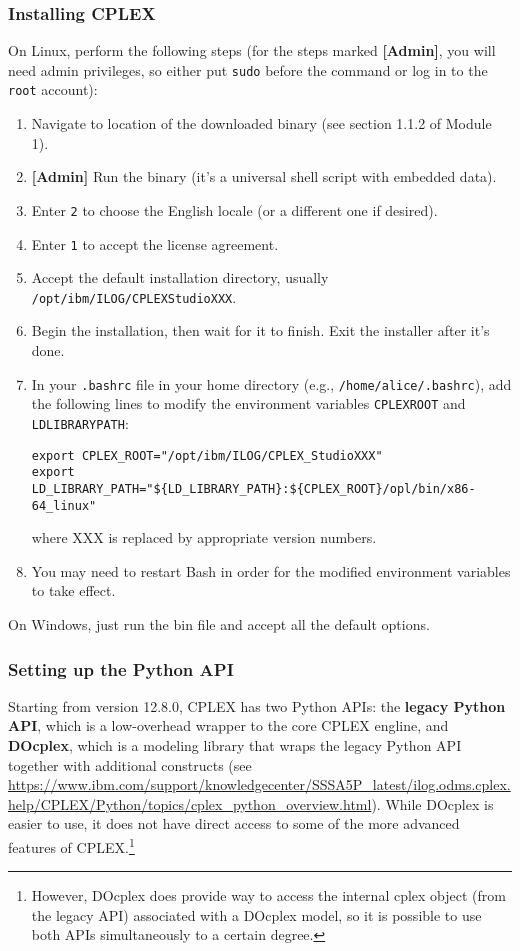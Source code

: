 \documentclass[12pt]{article}
\begin{document}
\subsubsection{Installing CPLEX}
On Linux, perform the following steps (for the steps marked \textbf{[Admin]}, you will need admin privileges, so either put \texttt{sudo} before the command or log in to the \texttt{root} account):
\begin{enumerate}
    \item Navigate to location of the downloaded binary (see section 1.1.2 of Module 1).
    \item \textbf{[Admin]} Run the binary (it's a universal shell script with embedded data).
    \item Enter \texttt{2} to choose the English locale (or a different one if desired).
    \item Enter \texttt{1} to accept the license agreement.
    \item Accept the default installation directory, usually \texttt{/opt/ibm/ILOG/CPLEX\ttul StudioXXX}.
    \item Begin the installation, then wait for it to finish. 
        Exit the installer after it's done.
    \item In your \texttt{.bashrc} file in your home directory (e.g., \texttt{/home/alice/.bashrc}), add the following lines to modify the environment variables \texttt{CPLEX\ttul ROOT} and \texttt{LD\ttul LIBRARY\ttul PATH}:
\begin{verbatim}
export CPLEX_ROOT="/opt/ibm/ILOG/CPLEX_StudioXXX"
export LD_LIBRARY_PATH="${LD_LIBRARY_PATH}:${CPLEX_ROOT}/opl/bin/x86-64_linux"
\end{verbatim}
        where XXX is replaced by appropriate version numbers.
    \item You may need to restart Bash in order for the modified environment variables to take effect.
\end{enumerate}
On Windows, just run the bin file and accept all the default options.

\subsubsection{Setting up the Python API}
Starting from version 12.8.0, CPLEX has two Python APIs: the \textbf{legacy Python API}, which is a low-overhead wrapper to the core CPLEX engline, and \textbf{DOcplex}, which is a modeling library that wraps the legacy Python API together with additional constructs (see \url{https://www.ibm.com/support/knowledgecenter/SSSA5P_latest/ilog.odms.cplex.help/CPLEX/Python/topics/cplex_python_overview.html}).
While DOcplex is easier to use, it does not have direct access to some of the more advanced features of CPLEX.\footnote{
    However, DOcplex does provide way to access the internal cplex object (from the legacy API) associated with a DOcplex model, so it is possible to use both APIs simultaneously to a certain degree.
}
\end{document}
